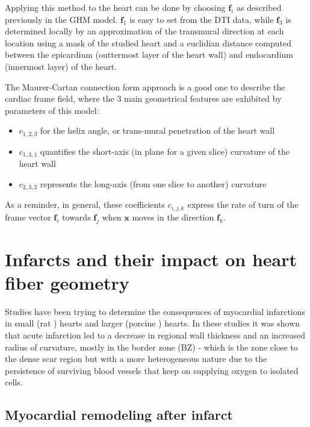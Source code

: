 Applying this method to the heart can be done by choosing $\mathbf{f}_i$ as described previously in the GHM model. $\mathbf{f}_1$ is easy to set from the DTI data, while $\mathbf{f}_3$ is determined locally by an approximation of the transmural direction at each location using a mask of the studied heart and a euclidian distance computed between the epicardium (outtermost layer of the heart wall) and endocardium (innermost layer) of the heart.

The Maurer-Cartan connection form approach is a good one to describe the cardiac frame field, where the 3 main geometrical features are exhibited by parameters of this model:
\begin{itemize}
    \item $c_{1,2,3}$ for the helix angle, or trans-mural penetration of the heart wall
    \item $c_{1,3,1}$ quantifies the short-axis (in plane for a given slice) curvature of the heart wall
    \item $c_{2,3,2}$ represents the long-axis (from one slice to another) curvature
\end{itemize}
As a reminder, in general, these coefficients $c_{i,j,k}$ express the rate of turn of the frame vector $\mathbf{f}_i$ towards $\mathbf{f}_j$ when $\mathbf{x}$ moves in the direction $\mathbf{f}_k$.

\section{Infarcts and their impact on heart fiber geometry}

Studies have been trying to determine the consequences of myocardial infarctions in small (rat \cite{weisman1985global}) hearts and larger (porcine \cite{wu2007mr, mediamihaela}) hearts. In these studies it was shown that acute infarction led to a decrease in regional wall thickness and an increased radius of curvature, mostly in the border zone (BZ) - which is the zone close to the dense scar region but with a more heterogeneous nature due to the persistence of surviving blood vessels that keep on supplying oxygen to isolated cells.

\subsection{Myocardial remodeling after infarct}

